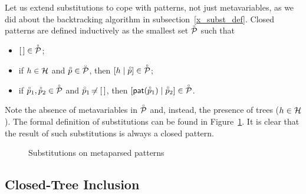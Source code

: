 Let us extend substitutions to cope with patterns, not just
meta\-variables, as we did about the back\-tracking algorithm in
sub\-section~\ref{x_subst_def}. Closed patterns are defined
inductively as the smallest set \(\close{\cal P}\) such that
\begin{itemize}

  \item \(\el \in \close{\cal P}\);

  \item if \(h \in {\cal H}\) and \(\close{p} \in \close{\cal P}\),
        then \(\cons{h}{\close{p}} \in \close{\cal P}\);

  \item if \(\close{p}_1, \close{p}_2 \in \close{\cal P}\) and
    \(\accentset{\circ}{p}_1 \not\nobreak\mkern -2mu = [\,]\), then
    \(\cons{\pat{\close{p}_1}}{\close{p}_2} \in \close{\cal P}\).

\end{itemize}
Note the absence of meta\-variables in \(\close{\cal P}\) and,
instead, the presence of trees (\(h \in {\cal H}\)). The formal
definition of substitutions can be found in
Figure~\ref{es1_subst_def}. It is clear that the result of such
substitutions is always a closed pattern.
\begin{figure}[b]
\caption{Substitutions on meta\-parsed patterns%
\label{es1_subst_def}}
\end{figure}


\subsection{Closed\hyp{}Tree Inclusion}

